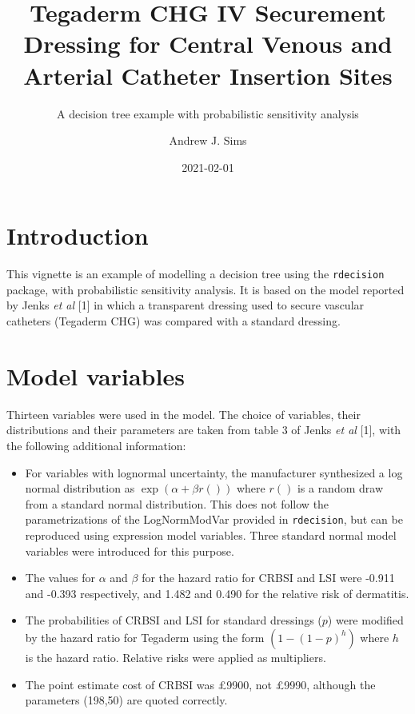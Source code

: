 \documentclass[
]{article}
\title{Tegaderm CHG IV Securement Dressing for Central Venous and Arterial
Catheter Insertion Sites}
\subtitle{A decision tree example with probabilistic sensitivity analysis}
\author{Andrew J. Sims}
\date{2021-02-01}
\providecommand{\tightlist}{%
  \setlength{\itemsep}{0pt}\setlength{\parskip}{0pt}}
\begin{document}
\maketitle

\hypertarget{introduction}{%
\section{Introduction}\label{introduction}}

This vignette is an example of modelling a decision tree using the
\texttt{rdecision} package, with probabilistic sensitivity analysis. It
is based on the model reported by Jenks \emph{et al} {[}1{]} in which a
transparent dressing used to secure vascular catheters (Tegaderm CHG)
was compared with a standard dressing.

\hypertarget{model-variables}{%
\section{Model variables}\label{model-variables}}

Thirteen variables were used in the model. The choice of variables,
their distributions and their parameters are taken from table 3 of Jenks
\emph{et al} {[}1{]}, with the following additional information:

\begin{itemize}
\tightlist
\item
  For variables with lognormal uncertainty, the manufacturer synthesized
  a log normal distribution as \(\exp(\alpha + \beta r())\) where
  \(r()\) is a random draw from a standard normal distribution. This
  does not follow the parametrizations of the LogNormModVar provided in
  \texttt{rdecision}, but can be reproduced using expression model
  variables. Three standard normal model variables were introduced for
  this purpose.
\item
  The values for \(\alpha\) and \(\beta\) for the hazard ratio for CRBSI
  and LSI were -0.911 and -0.393 respectively, and 1.482 and 0.490 for
  the relative risk of dermatitis.
\item
  The probabilities of CRBSI and LSI for standard dressings (\(p\)) were
  modified by the hazard ratio for Tegaderm using the form
  \((1-(1-p)^h)\) where \(h\) is the hazard ratio. Relative risks were
  applied as multipliers.
\item
  The point estimate cost of CRBSI was £9900, not £9990, although the
  parameters (198,50) are quoted correctly.
\end{itemize}
\end{document}
